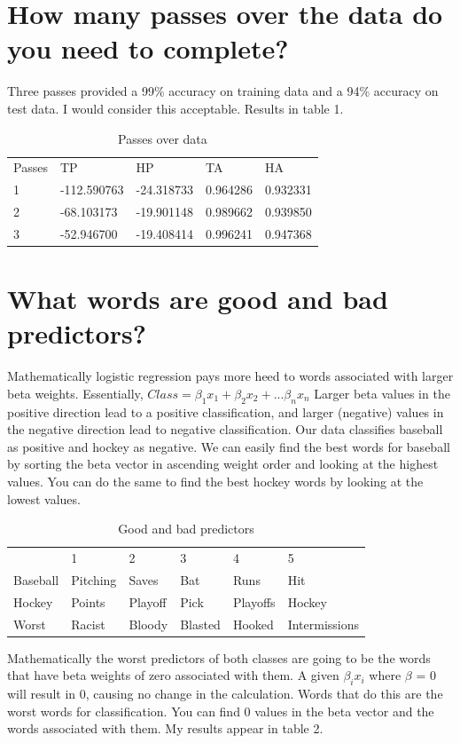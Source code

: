 \documentclass{article}
\begin{document}
\section{How many passes over the data do you need to complete?} 
Three passes provided a 99\% accuracy on training data and a 94\% accuracy on test data. I would consider this acceptable. Results in table 1. 
\begin{table}[]
\centering
\caption{Passes over data}
\label{Passes}
\begin{tabular}{lllll}
Passes & TP          & HP         & TA       & HA       \\
1      & -112.590763 & -24.318733 & 0.964286 & 0.932331 \\
2      & -68.103173  & -19.901148 & 0.989662 & 0.939850 \\
3      & -52.946700  & -19.408414 & 0.996241 & 0.947368
\end{tabular}
\end{table}

\section{What words are good and bad predictors?}
Mathematically logistic regression pays more heed to words associated with larger beta weights. Essentially, $Class = \beta_1 x_1 +\beta_2 x_2 + . . .\beta_n x_n $ Larger beta values in the positive direction lead to a positive classification, and larger (negative) values in the negative direction lead to negative classification. Our data classifies baseball as positive and hockey as negative. We can easily find the best words for baseball by sorting the beta vector in ascending weight order and looking at the highest values. You can do the same to find the best hockey words by looking at the lowest values. 
\begin{table}[]
\caption{Good and bad predictors}
\label{}
\begin{tabular}{llllll}
         & 1        & 2       & 3    & 4        & 5      \\
Baseball & Pitching & Saves   & Bat  & Runs     & Hit    \\
Hockey   & Points   & Playoff & Pick & Playoffs & Hockey \\
Worst & Racist & Bloody & Blasted & Hooked & Intermissions
\end{tabular}
\end{table}
Mathematically the worst predictors of both classes are going to be the words that have beta weights of zero associated with them. A given $\beta_i x_i$ where $\beta$ = 0 will result in 0, causing no change in the calculation. Words that do this are the worst words for classification. You can find 0 values in the beta vector and the words associated with them. My results appear in table 2. 
\end{document}

